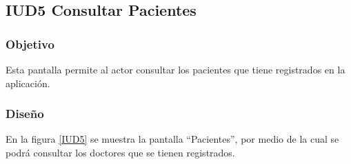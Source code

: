 \subsection{IUD5 Consultar Pacientes}
 
\subsubsection{Objetivo}

    Esta pantalla permite al actor consultar los pacientes que tiene registrados en la aplicación.

\subsubsection{Diseño}

    En la figura \ref{IUD5} se muestra la pantalla ``Pacientes'', por medio de la cual se podrá consultar los doctores que se tienen registrados. \\


%
%
